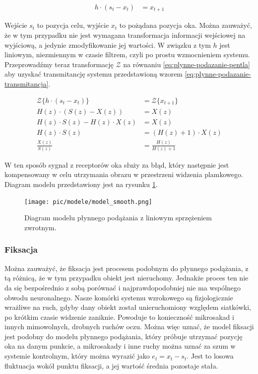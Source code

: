 \documentclass[a4paper,twoside,12pt]{book}
\begin{document}
\begin{align}
	h \cdot (s_t - x_t) &= x_{t+1} 
	\label{eq:plynne-podazanie-pentla}
\end{align}

Wejście $s_t$ to pozycja celu, wyjście $x_t$ to pożądana pozycja oka. Można zauważyć, że w tym przypadku nie jest wymagana transformacja informacji wejściowej na wyjściową, a jedynie zmodyfikowanie jej wartości. W związku z tym $h$ jest liniowym, niezmiennym w czasie filtrem, czyli po prostu wzmocnieniem systemu. Przeprowadźmy teraz transformację $\mathcal{Z}$ na równaniu \ref{eq:plynne-podazanie-pentla} aby uzyskać transmitancję systemu przedstawioną wzorem \ref{eq:plynne-podazanie-transmitancja}.

\begin{align} %
	\mathcal{Z}\{h \cdot (s_t - x_t)\} &= \mathcal{Z}\{x_{t+1}\} \nonumber \\
	H(z) \cdot (S(z) - X(z)) &=  X(z) \nonumber \\ %
	H(z) \cdot S(z) - H(z) \cdot X(z) &=  X(z) \nonumber \\
	H(z) \cdot S(z) &= (H(z) + 1) \cdot X(z) \nonumber \\
	\frac{X(z)}{S(z)} &= \frac{H(z)}{H(z) + 1} \label{eq:plynne-podazanie-transmitancja}
\end{align}   %

W ten sposób sygnał z receptorów oka służy za błąd, który następnie jest kompensowany w celu utrzymania obrazu w przestrzeni widzenia plamkowego. Diagram modelu przedstawiony jest na rysunku \ref{fig:model-smooth}.

\begin{figure}[htbp]
	\centering
	\texttt{[image: pic/modele/model\_smooth.png]}
	\caption{Diagram modelu płynnego podążania z liniowym sprzężeniem zwrotnym.}
	\label{fig:model-smooth}
\end{figure}

\subsubsection{Fiksacja}
\label{subsubsec:fiksacja}

Można zauważyć, że fiksacja jest procesem podobnym do płynnego podążania, z tą różnicą, że w tym przypadku obiekt jest nieruchomy. Jednakże proces ten nie da się bezpośrednio z sobą porównać i najprawdopodobniej nie ma wspólnego obwodu neuronalnego. Nasze komórki systemu wzrokowego są fizjologicznie wrażliwe na ruch, gdyby dany obiekt został unieruchomiony względem siatkówki, po krótkim czasie widzenie zaniknie. Powoduje to konieczność mikrosakad i innych mimowolnych, drobnych ruchów oczu. Można więc uznać, że model fiksacji jest podobny do modelu płynnego podążania, który próbuje utrzymać pozycję oka na danym punkcie, a mikrosakady i inne ruchy można uznać za szum w systemie kontrolnym, który można wyrazić jako $e_t = x_t - s_t$. Jest to losowa fluktuacja wokół punktu fiksacji, a jej wartość średnia pozostaje stała.
\end{document}
